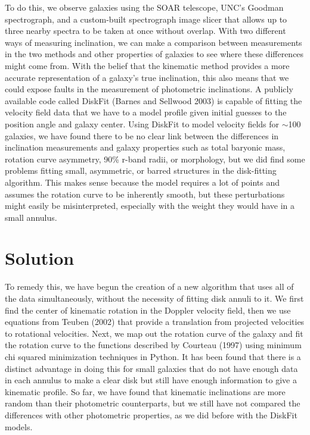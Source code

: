 \documentclass{emulateapj}
\begin{document}
To do this, we observe galaxies using the SOAR telescope, UNC's Goodman spectrograph, and a custom-built spectrograph image slicer that allows up to three nearby spectra to be taken at once without overlap. With two different ways of measuring inclination, we can make a comparison between measurements in the two methods and other properties of galaxies to see where these differences might come from. With the belief that the kinematic method provides a more accurate representation of a galaxy's true inclination, this also means that we could expose faults in the measurement of photometric inclinations. A publicly available code called DiskFit (Barnes and Sellwood 2003) is capable of fitting the velocity field data that we have to a model profile given initial guesses to the position angle and galaxy center. Using DiskFit to model velocity fields for $\sim$100 galaxies, we have found there to be no clear link between the differences in inclination measurements and galaxy properties such as total baryonic mass, rotation curve asymmetry, 90\% r-band radii, or morphology, but we did find some problems fitting small, asymmetric, or barred structures in the disk-fitting algorithm. This makes sense because the model requires a lot of points and assumes the rotation curve to be inherently smooth, but these perturbations might easily be misinterpreted, especially with the weight they would have in a small annulus.

\section{Solution}

To remedy this, we have begun the creation of a new algorithm that uses all of the data simultaneously, without the necessity of fitting disk annuli to it. We first find the center of kinematic rotation in the Doppler velocity field, then we use equations from Teuben (2002) that provide a translation from projected velocities to rotational velocities. Next, we map out the rotation curve of the galaxy and fit the rotation curve to the functions described by Courteau (1997) using minimum chi squared minimization techniques in Python. It has been found that there is a distinct advantage in doing this for small galaxies that do not have enough data in each annulus to make a clear disk but still have enough information to give a kinematic profile. So far, we have found that kinematic inclinations are more random than their photometric counterparts, but we still have not compared the differences with other photometric properties, as we did before with the DiskFit models.
\end{document}
